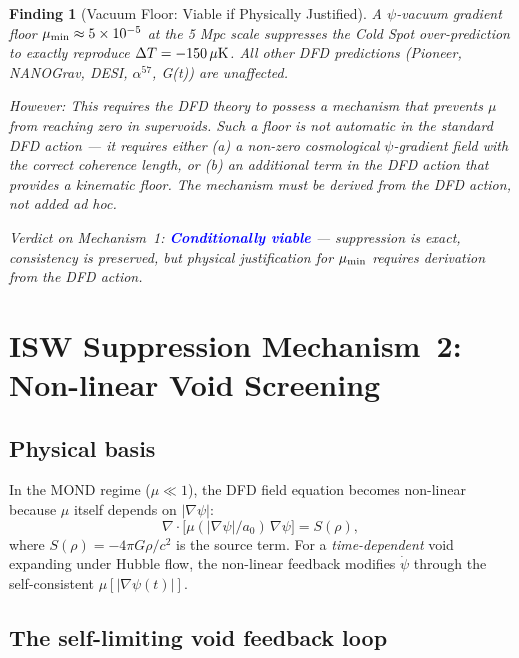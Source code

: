 \documentclass[11pt]{article}
\newtheorem{finding}{Finding}
\newcommand{\ee}[1]{\times 10^{#1}}
\newcommand{\mufd}{\mu}
\newcommand{\mumin}{\mu_{\rm min}}
\newcommand{\deltaT}{\Delta T}
\begin{document}
\begin{finding}[Vacuum Floor: Viable if Physically Justified]\label{find:vacfloor}
A $\psi$-vacuum gradient floor $\mumin \approx 5\ee{-5}$ at the 5 Mpc
scale suppresses the Cold Spot over-prediction to exactly reproduce
$\deltaT = -150\,\mu{\rm K}$.  All other DFD predictions (Pioneer,
NANOGrav, DESI, $\alpha^{57}$, G(t)) are unaffected.

\textit{However:} This requires the DFD theory to possess a mechanism
that prevents $\mufd$ from reaching zero in supervoids.  Such a floor
is \textit{not} automatic in the standard DFD action --- it requires
either (a) a non-zero cosmological $\psi$-gradient field with the
correct coherence length, or (b) an additional term in the DFD action
that provides a kinematic floor.  The mechanism must be derived from
the DFD action, not added ad hoc.

\textit{Verdict on Mechanism~1:} \textcolor{blue}{\textbf{Conditionally
viable}} --- suppression is exact, consistency is preserved, but physical
justification for $\mumin$ requires derivation from the DFD action.
\end{finding}

\section{ISW Suppression Mechanism~2: Non-linear Void Screening}
\label{sec:mechanism2-nonlinear}

\subsection{Physical basis}

In the MOND regime ($\mufd \ll 1$), the DFD field equation becomes
non-linear because $\mufd$ itself depends on $|\nabla\psi|$:
\begin{equation}\label{eq:dfd-nonlinear}
  \nabla\cdot\bigl[\mufd(|\nabla\psi|/a_0)\,\nabla\psi\bigr] = S(\rho),
\end{equation}
where $S(\rho) = -4\pi G\rho/c^2$ is the source term.  For a
\emph{time-dependent} void expanding under Hubble flow, the non-linear
feedback modifies $\dot\psi$ through the self-consistent $\mufd[|\nabla\psi(t)|]$.

\subsection{The self-limiting void feedback loop}
\end{document}
